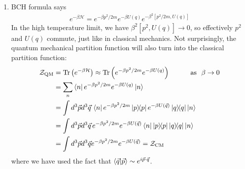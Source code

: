 \documentclass{article}
\theoremstyle{definition}
\newcommand{\ham}{\mathcal{H}}
\newcommand{\be}{\beta}
\newcommand{\lp}{\left(}
\newcommand{\rp}{\right)}
\begin{document}
\begin{enumerate}[label=(\alph*)]
	\item BCH formula says
	\begin{align*}
	e^{-\be \ham} = e^{-\be p^2/2m} e^{-\be U({q})} e^{-\be^2 [p^2/2m, U({q})]} 
	\end{align*}
	In the high temperature limit, we have $\be^2 [p^2, U({q})] \to 0$, so effectively $p^2$ and $U({q})$ commute, just like in classical mechanics. Not surprisingly, the quantum mechanical partition function will also turn into the classical partition function:
	\begin{align*}
	\mathcal{Z}_\text{QM} 
	&= \Tr\lp e^{-\be \ham}  \rp \approx  \Tr\lp e^{-\be p^2/2m} e^{-\be U({q})} \rp\quad\quad\quad \text{as  }\,\,\be \to 0 \\
	&= \sum_{n}\bra{n} e^{-\be p^2/2m} e^{-\be U({q})} \ket{{n}}\\
	&= \int d^3  \vec{p} d^3 \vec{q} \, \bra{n}e^{-\be p^2/2m} \ketbra{p}  e^{-\be U(\vec{q})} \ketbra{q} \ket{n}\\
	&= \int d^3  \vec{p} d^3 \vec{q} \,
	e^{-\be p^2/2m} e^{-\be U(\vec{q})} \bra{n}\ketbra{p}   \ketbra{q} \ket{n}\\
	&= \int d^3  \vec{p} d^3 \vec{q}  e^{-\be p^2/2m}  e^{-\be U(\vec{q})} = \mathcal{Z}_\text{CM}
	\end{align*}
	where we have used the fact that $\bra{\vec{q}}\ket{\vec{p}} \sim e^{i \vec{p}\cdot \vec{q}}$. 
	

\end{enumerate}
\end{document}
